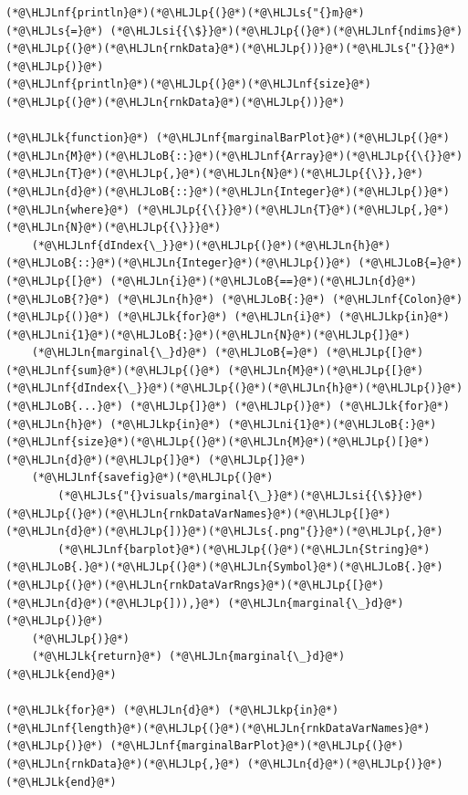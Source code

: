 \documentclass[12pt,a4paper]{article}
\newcommand{\HLJLk}[1]{\textcolor[RGB]{148,91,176}{\textbf{#1}}}
\newcommand{\HLJLkp}[1]{\textcolor[RGB]{148,91,176}{\textbf{#1}}}
\newcommand{\HLJLn}[1]{#1}
\newcommand{\HLJLnf}[1]{\textcolor[RGB]{66,102,213}{#1}}
\newcommand{\HLJLs}[1]{\textcolor[RGB]{201,61,57}{#1}}
\newcommand{\HLJLsi}[1]{#1}
\newcommand{\HLJLni}[1]{\textcolor[RGB]{59,151,46}{#1}}
\newcommand{\HLJLoB}[1]{\textcolor[RGB]{102,102,102}{\textbf{#1}}}
\newcommand{\HLJLp}[1]{#1}
\begin{document}
\begin{lstlisting}
(*@\HLJLnf{println}@*)(*@\HLJLp{(}@*)(*@\HLJLs{"{}m}@*) (*@\HLJLs{=}@*) (*@\HLJLsi{{\$}}@*)(*@\HLJLp{(}@*)(*@\HLJLnf{ndims}@*)(*@\HLJLp{(}@*)(*@\HLJLn{rnkData}@*)(*@\HLJLp{))}@*)(*@\HLJLs{"{}}@*)(*@\HLJLp{)}@*)
(*@\HLJLnf{println}@*)(*@\HLJLp{(}@*)(*@\HLJLnf{size}@*)(*@\HLJLp{(}@*)(*@\HLJLn{rnkData}@*)(*@\HLJLp{))}@*)

(*@\HLJLk{function}@*) (*@\HLJLnf{marginalBarPlot}@*)(*@\HLJLp{(}@*)(*@\HLJLn{M}@*)(*@\HLJLoB{::}@*)(*@\HLJLnf{Array}@*)(*@\HLJLp{{\{}}@*)(*@\HLJLn{T}@*)(*@\HLJLp{,}@*)(*@\HLJLn{N}@*)(*@\HLJLp{{\}},}@*) (*@\HLJLn{d}@*)(*@\HLJLoB{::}@*)(*@\HLJLn{Integer}@*)(*@\HLJLp{)}@*) (*@\HLJLn{where}@*) (*@\HLJLp{{\{}}@*)(*@\HLJLn{T}@*)(*@\HLJLp{,}@*)(*@\HLJLn{N}@*)(*@\HLJLp{{\}}}@*)
	(*@\HLJLnf{dIndex{\_}}@*)(*@\HLJLp{(}@*)(*@\HLJLn{h}@*)(*@\HLJLoB{::}@*)(*@\HLJLn{Integer}@*)(*@\HLJLp{)}@*) (*@\HLJLoB{=}@*) (*@\HLJLp{[}@*) (*@\HLJLn{i}@*)(*@\HLJLoB{==}@*)(*@\HLJLn{d}@*) (*@\HLJLoB{?}@*) (*@\HLJLn{h}@*) (*@\HLJLoB{:}@*) (*@\HLJLnf{Colon}@*)(*@\HLJLp{()}@*) (*@\HLJLk{for}@*) (*@\HLJLn{i}@*) (*@\HLJLkp{in}@*) (*@\HLJLni{1}@*)(*@\HLJLoB{:}@*)(*@\HLJLn{N}@*)(*@\HLJLp{]}@*)
	(*@\HLJLn{marginal{\_}d}@*) (*@\HLJLoB{=}@*) (*@\HLJLp{[}@*) (*@\HLJLnf{sum}@*)(*@\HLJLp{(}@*) (*@\HLJLn{M}@*)(*@\HLJLp{[}@*) (*@\HLJLnf{dIndex{\_}}@*)(*@\HLJLp{(}@*)(*@\HLJLn{h}@*)(*@\HLJLp{)}@*)(*@\HLJLoB{...}@*) (*@\HLJLp{]}@*) (*@\HLJLp{)}@*) (*@\HLJLk{for}@*) (*@\HLJLn{h}@*) (*@\HLJLkp{in}@*) (*@\HLJLni{1}@*)(*@\HLJLoB{:}@*)(*@\HLJLnf{size}@*)(*@\HLJLp{(}@*)(*@\HLJLn{M}@*)(*@\HLJLp{)[}@*)(*@\HLJLn{d}@*)(*@\HLJLp{]}@*) (*@\HLJLp{]}@*)
	(*@\HLJLnf{savefig}@*)(*@\HLJLp{(}@*)
		(*@\HLJLs{"{}visuals/marginal{\_}}@*)(*@\HLJLsi{{\$}}@*)(*@\HLJLp{(}@*)(*@\HLJLn{rnkDataVarNames}@*)(*@\HLJLp{[}@*)(*@\HLJLn{d}@*)(*@\HLJLp{])}@*)(*@\HLJLs{.png"{}}@*)(*@\HLJLp{,}@*)
		(*@\HLJLnf{barplot}@*)(*@\HLJLp{(}@*)(*@\HLJLn{String}@*)(*@\HLJLoB{.}@*)(*@\HLJLp{(}@*)(*@\HLJLn{Symbol}@*)(*@\HLJLoB{.}@*)(*@\HLJLp{(}@*)(*@\HLJLn{rnkDataVarRngs}@*)(*@\HLJLp{[}@*)(*@\HLJLn{d}@*)(*@\HLJLp{])),}@*) (*@\HLJLn{marginal{\_}d}@*) (*@\HLJLp{)}@*)
	(*@\HLJLp{)}@*)
	(*@\HLJLk{return}@*) (*@\HLJLn{marginal{\_}d}@*)
(*@\HLJLk{end}@*)

(*@\HLJLk{for}@*) (*@\HLJLn{d}@*) (*@\HLJLkp{in}@*) (*@\HLJLnf{length}@*)(*@\HLJLp{(}@*)(*@\HLJLn{rnkDataVarNames}@*)(*@\HLJLp{)}@*) (*@\HLJLnf{marginalBarPlot}@*)(*@\HLJLp{(}@*)(*@\HLJLn{rnkData}@*)(*@\HLJLp{,}@*) (*@\HLJLn{d}@*)(*@\HLJLp{)}@*) (*@\HLJLk{end}@*)
\end{lstlisting}
\end{document}
